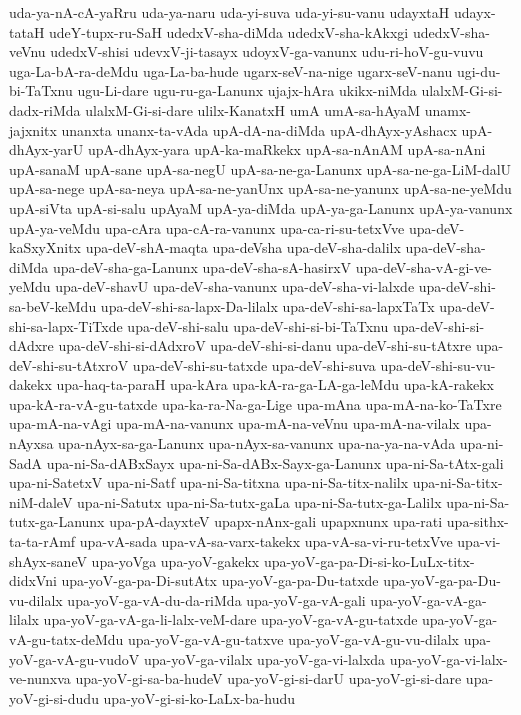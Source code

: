 {uda-ya-nA-cA-yaRru
uda-ya-naru
uda-yi-suva
uda-yi-su-vanu
udayxtaH
udayx-tataH
udeY-tupx-ru-SaH‌
udedxV-sha-diMda
udedxV-sha-kAkxgi
udedxV-sha-veVnu
udedxV-shisi
udevxV-ji-tasayx
udoyxV-ga-vanunx
udu-ri-hoV-gu-vuvu
uga-La-bA-ra-deMdu
uga-La-ba-hude
ugarx-seV-na-nige
ugarx-seV-nanu
ugi-du-bi-TaTxnu
ugu-Li-dare
ugu-ru-ga-Lanunx
ujajx-hAra
ukikx-niMda
ulalxM-Gi-si-dadx-riMda
ulalxM-Gi-si-dare
ulilx-KanatxH
umA
umA-sa-hAyaM
unamx-jajxnitx
unanxta
unanx-ta-vAda
upA-dA-na-diMda
upA-dhAyx-yAshacx
upA-dhAyx-yarU
upA-dhAyx-yara
upA-ka-maRkekx
upA-sa-nAnAM
upA-sa-nAni
upA-sanaM
upA-sane
upA-sa-negU
upA-sa-ne-ga-Lanunx
upA-sa-ne-ga-LiM-dalU
upA-sa-nege
upA-sa-neya
upA-sa-ne-yanUnx
upA-sa-ne-yanunx
upA-sa-ne-yeMdu
upA-siVta
upA-si-salu
upAyaM
upA-ya-diMda
upA-ya-ga-Lanunx
upA-ya-vanunx
upA-ya-veMdu
upa-cAra
upa-cA-ra-vanunx
upa-ca-ri-su-tetxVve
upa-deV-kaSxyXnitx
upa-deV-shA-maqta
upa-deVsha
upa-deV-sha-dalilx
upa-deV-sha-diMda
upa-deV-sha-ga-Lanunx
upa-deV-sha-sA-hasirxV
upa-deV-sha-vA-gi-ve-yeMdu
upa-deV-shavU
upa-deV-sha-vanunx
upa-deV-sha-vi-lalxde
upa-deV-shi-sa-beV-keMdu
upa-deV-shi-sa-lapx-Da-lilalx
upa-deV-shi-sa-lapxTaTx
upa-deV-shi-sa-lapx-TiTxde
upa-deV-shi-salu
upa-deV-shi-si-bi-TaTxnu
upa-deV-shi-si-dAdxre
upa-deV-shi-si-dAdxroV
upa-deV-shi-si-danu
upa-deV-shi-su-tAtxre
upa-deV-shi-su-tAtxroV
upa-deV-shi-su-tatxde
upa-deV-shi-suva
upa-deV-shi-su-vu-dakekx
upa-haq-ta-paraH
upa-kAra
upa-kA-ra-ga-LA-ga-leMdu
upa-kA-rakekx
upa-kA-ra-vA-gu-tatxde
upa-ka-ra-Na-ga-Lige
upa-mAna
upa-mA-na-ko-TaTxre
upa-mA-na-vAgi
upa-mA-na-vanunx
upa-mA-na-veVnu
upa-mA-na-vilalx
upa-nAyxsa
upa-nAyx-sa-ga-Lanunx
upa-nAyx-sa-vanunx
upa-na-ya-na-vAda
upa-ni-SadA
upa-ni-Sa-dABxSayx
upa-ni-Sa-dABx-Sayx-ga-Lanunx
upa-ni-Sa-tAtx-gali
upa-ni-SatetxV
upa-ni-Satf
upa-ni-Sa-titxna
upa-ni-Sa-titx-nalilx
upa-ni-Sa-titx-niM-daleV
upa-ni-Satutx
upa-ni-Sa-tutx-gaLa
upa-ni-Sa-tutx-ga-Lalilx
upa-ni-Sa-tutx-ga-Lanunx
upa-pA-dayxteV
upapx-nAnx-gali
upapxnunx
upa-rati
upa-sithx-ta-ta-rAmf
upa-vA-sada
upa-vA-sa-varx-takekx
upa-vA-sa-vi-ru-tetxVve
upa-vi-shAyx-saneV
upa-yoVga
upa-yoV-gakekx
upa-yoV-ga-pa-Di-si-ko-LuLx-titx-didxVni
upa-yoV-ga-pa-Di-sutAtx
upa-yoV-ga-pa-Du-tatxde
upa-yoV-ga-pa-Du-vu-dilalx
upa-yoV-ga-vA-du-da-riMda
upa-yoV-ga-vA-gali
upa-yoV-ga-vA-ga-lilalx
upa-yoV-ga-vA-ga-li-lalx-veM-dare
upa-yoV-ga-vA-gu-tatxde
upa-yoV-ga-vA-gu-tatx-deMdu
upa-yoV-ga-vA-gu-tatxve
upa-yoV-ga-vA-gu-vu-dilalx
upa-yoV-ga-vA-gu-vudoV
upa-yoV-ga-vilalx
upa-yoV-ga-vi-lalxda
upa-yoV-ga-vi-lalx-ve-nunxva
upa-yoV-gi-sa-ba-hudeV
upa-yoV-gi-si-darU
upa-yoV-gi-si-dare
upa-yoV-gi-si-dudu
upa-yoV-gi-si-ko-LaLx-ba-hudu
}
